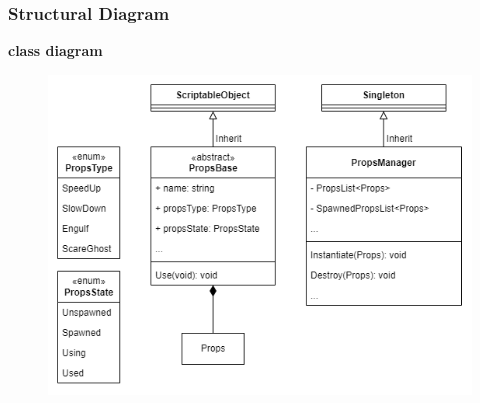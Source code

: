 \documentclass[11pt]{article}
\begin{document}
\subsubsection{Structural Diagram}
\textbf{class diagram}\\
\begin{figure}[H]
    \centering
    \includegraphics*[scale=0.4]{Props-Class.png}
\end{figure}
\end{document}

